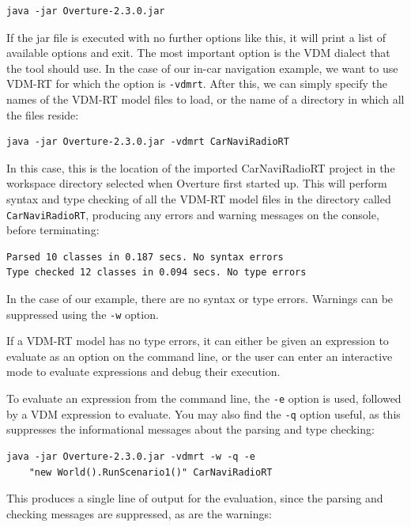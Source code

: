 \lstset{style=tool,language=}
\begin{lstlisting}
java -jar Overture-2.3.0.jar
\end{lstlisting}

\noindent If the jar file is executed with no further options like this, it will
print a list of available options and exit. The most important option is the VDM
dialect that the tool should use. In the case of our in-car navigation example, we want to
use VDM-RT for which the option is \verb|-vdmrt|. After this, we can simply
specify the names of the VDM-RT model files to load, or the name of a directory
in which all the files reside:

\begin{lstlisting}
java -jar Overture-2.3.0.jar -vdmrt CarNaviRadioRT
\end{lstlisting}

\noindent In this case, this is the location of the imported CarNaviRadioRT project in the workspace directory selected when Overture first started up.  This will perform syntax and type checking of all the VDM-RT model
files in the directory called \verb|CarNaviRadioRT|, producing any errors and warning
messages on the console, before terminating:

\begin{lstlisting}
Parsed 10 classes in 0.187 secs. No syntax errors
Type checked 12 classes in 0.094 secs. No type errors
\end{lstlisting}

\noindent In the case of our example, there are no syntax or type
errors. Warnings can be suppressed using the \verb|-w| option.

If a VDM-RT model has no type errors, it can either be given an
expression to evaluate as an option on the command line, or the user can enter
an interactive mode to evaluate expressions and debug their execution.

To evaluate an expression from the command line, the \verb|-e| option is used,
followed by a VDM expression to evaluate. You may also find the \verb|-q|
option useful, as this suppresses the informational messages about the parsing
and type checking:

\begin{lstlisting}
java -jar Overture-2.3.0.jar -vdmrt -w -q -e 
    "new World().RunScenario1()" CarNaviRadioRT
\end{lstlisting}

\noindent This produces a single line of output for the evaluation, since the
parsing and checking messages are suppressed, as are the warnings:

